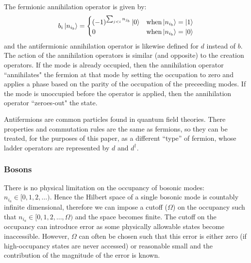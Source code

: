 The fermionic annihilation operator is given by:
\begin{equation}
    \label{eq:fermionic-annihilation}
    b_i \ket{n_{i_b}} = 
    \begin{cases} 
        (-1)^{\sum_{j < i} n_{j_b}} \ket{0}  & {\rm when} \ket{n_{i_b}} = \ket{1} \\
        0 & {\rm when} \ket{n_{i_b}} = \ket{0}
    \end{cases}
\end{equation}
and the antifermionic annihilation operator is likewise defined for $d$ instead of $b$.
The action of the annihilation operators is similar (and opposite) to the creation operators.
If the mode is already occupied, then the annihilation operator ``annihilates" the fermion at that mode by setting the occupation to zero and applies a phase based on the parity of the occupation of the preceeding modes.
If the mode is unoccupied before the operator is applied, then the annihilation operator ``zeroes-out" the state.

Antifermions are common particles found in quantum field theories.
There properties and commutation rules are the same as fermions, so they can be treated, for the purposes of this paper, as a different ``type'' of fermion, whose ladder operators are represented by $d$ and $d^\dagger$.

\subsubsection{Bosons}
There is no physical limitation on the occupancy of bosonic modes: $n_{i_a} \in [0, 1, 2, \dots)$.
Hence the Hilbert space of a single bosonic mode is countably infinite dimensional, therefore we can impose a cutoff ($\Omega$) on the occupancy such that $n_{i_a} \in [0, 1, 2, \dots, \Omega)$ and the space becomes finite.
The cutoff on the occupancy can introduce error as some physically allowable states become inaccessible.
However, $\Omega$ can often be chosen such that this error is either zero (if high-occupancy states are never accessed) or reasonable small and the contribution of the magnitude of the error is known. 


